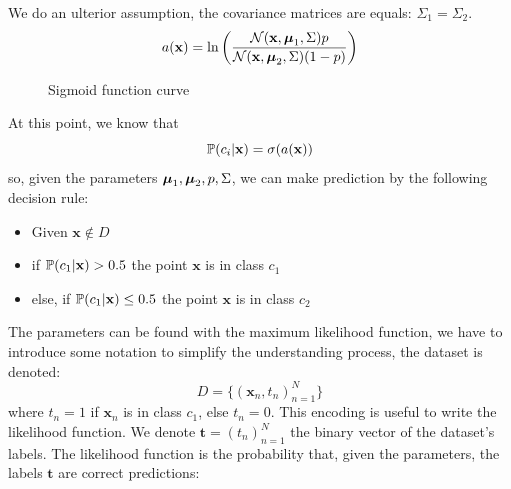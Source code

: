 \documentclass[10pt, letterpaper]{report}
\begin{document}
We do an ulterior assumption, the covariance matrices are equals: $\Sigma_1=\Sigma_2$.
\begin{equation}
	a(\mathbf x)=
	\ln\left(\frac{\mathcal N(\mathbf x,{\boldsymbol{\mu}}_1,\Sigma)p}{\mathcal N(\mathbf x,{\boldsymbol{\mu}}_2,\Sigma)(1-p)}\right)
\end{equation}
\begin{figure}[h!]
	\centering
	\caption{Sigmoid function curve}
\end{figure}
At this point, we know that
\begin{equation}
	{\mathbb P}(c_i|\mathbf x)=\sigma(a(\mathbf x))
\end{equation}
so, given the parameters ${\boldsymbol{\mu}}_1,{\boldsymbol{\mu}}_2,p,\Sigma$, we can make prediction by the following decision rule:\begin{itemize}
	\item Given $\mathbf x\notin D$
	\item if ${\mathbb P}(c_1|\mathbf x)>0.5$ the point $\mathbf x$ is in class $c_1$
	\item else, if ${\mathbb P}(c_1|\mathbf x)\le0.5$ the point $\mathbf x$ is in class $c_2$
\end{itemize}
The parameters can be found with the maximum likelihood function, we have to introduce some notation to simplify the understanding process, the dataset is denoted:\begin{equation}
	D=\{(\mathbf x_n,t_n)_{n=1}^N\}
\end{equation}
where $t_n=1$ if $\mathbf x_n$ is in class $c_1$, else $t_n=0$. This encoding is useful to write the likelihood function. We denote $\mathbf t=(t_n)_{n=1}^N$ the binary vector of the dataset's labels. The likelihood function is the probability that, given the parameters, the labels $\mathbf t$ are correct predictions:
\end{document}

